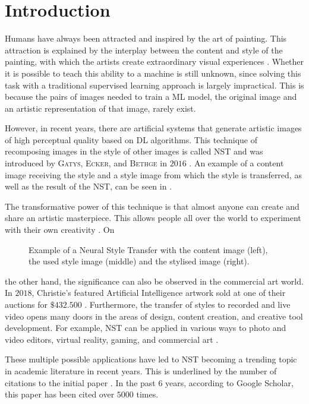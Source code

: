 \section{Introduction}
Humans have always been attracted and inspired by the art of painting. This attraction is explained by the interplay between the content and style of the painting, with which the artists create extraordinary visual experiences \cite{Glas2021}. Whether it is possible to teach this ability to a machine is still unknown, since solving this task with a traditional supervised learning approach is largely impractical. This is because the pairs of images needed to train a \gls{ML} model, the original image and an artistic representation of that image, rarely exist.
 
However, in recent years, there are artificial systems that generate artistic images of high perceptual quality based on \gls{DL} algorithms. This technique of recomposing images in the style of other images is called \gls{NST} and was introduced by \textsc{Gatys}, \textsc{Ecker}, and \textsc{Bethge} in $2016$ \cite{GEB2016}. An example of a content image receiving the style and a style image from which the style is transferred, as well as the result of the \gls{NST}, can be seen in . 

The transformative power of this technique is that almost anyone can create and share an artistic masterpiece. This allows people all over the world to experiment with their own creativity \cite{Kel2018}. On 
\begin{figure*}[h]
	\centering
	
	\caption{Example of a Neural Style Transfer with the content image \contentimage{} (left), the used style image \styleimage{} (middle) and the stylised image \image{} (right).}
	\label{fig:fig_nst}
\end{figure*}
the other hand, the significance can also be observed in the commercial art world. In $2018$, Christie's featured Artificial Intelligence artwork sold at one of their auctions for $\$432.500$ \cite{2018}. Furthermore, the transfer of styles to recorded and live video opens many doors in the areas of design, content creation, and creative tool development. For example, \gls{NST} can be applied in various ways to photo and video editors, virtual reality, gaming, and commercial art \cite{Glas2021, Ioa2021}.

These multiple possible applications have led to \gls{NST} becoming a trending topic in academic literature in recent years. This is underlined by the number of citations to the initial paper  \cite{GEB2016}. In the past $6$ years, according to Google Scholar, this paper has been cited over $5000$ times. 

